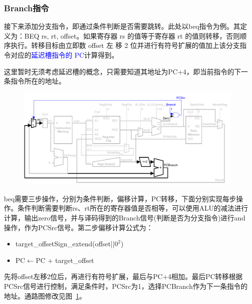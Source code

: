 \subsubsection{Branch指令}
接下来添加分支指令，即通过条件判断是否需要跳转。此处以beq指令为例。其定义为：BEQ rs, rt, offset。如果寄存器 rs 的值等于寄存器 rt 的值则转移，否则顺序执行。转移目标由立即数 offset 左
移 2 位并进行有符号扩展的值加上该分支指令对应的\textcolor{blue}{延迟槽指令的 PC}计算得到。

这里暂时无须考虑延迟槽的概念，只需要知道其地址为PC+4，即当前指令的下一条指令所在的地址。
\begin{figure}[htbp]
	\centering
	\includegraphics[width=1.0\textwidth]{image/beq.pdf}
	\caption{\label{fig:beq}}
\end{figure}

beq需要三步操作，分别为条件判断，偏移计算，PC转移，下面分别实现每步操作。条件判断需要判断rs、rt所在的寄存器值是否相等，可以使用ALU的减法进行计算，输出zero信号，并与译码得到的Branch信号(判断是否为分支指令)进行and操作，作为PCSrc信号。第二步偏移计算公式为：
\begin{itemize}
    \item target\_offsetSign\_extend(offset||$0^{2}$)
    \item PC$\leftarrow$PC + target\_offset
\end{itemize}

先将offset左移2位后，再进行有符号扩展，最后与PC+4相加。最后PC转移根据PCSrc信号进行控制，满足条件时，PCSrc为1，选择PCBranch作为下一条指令的地址。通路图修改见图~\ref{fig:beq}。



